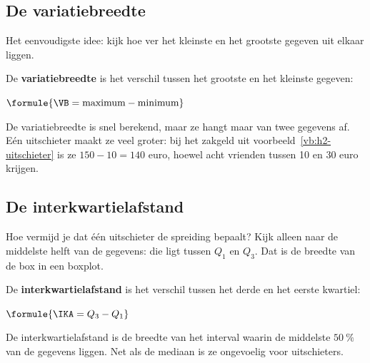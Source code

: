 \subsection{De variatiebreedte}

Het eenvoudigste idee: kijk hoe ver het kleinste en het grootste gegeven uit elkaar liggen.

\begin{theorie}
De \textbf{\textcolor{accent}{variatiebreedte}} is het verschil tussen het grootste en het kleinste gegeven:

\vspace{1mm}
\qquad $\formule{\VB = \text{maximum} - \text{minimum}}$
\end{theorie}


De variatiebreedte is snel berekend, maar ze hangt maar van twee gegevens af. Eén uitschieter maakt ze veel groter: bij het zakgeld uit voorbeeld~\ref{vb:h2-uitschieter} is ze $150 - 10 = 140$ euro, hoewel acht vrienden tussen 10 en 30 euro krijgen.

\subsection{De interkwartielafstand}

Hoe vermijd je dat één uitschieter de spreiding bepaalt? Kijk alleen naar de middelste helft van de gegevens: die ligt tussen $Q_1$ en $Q_3$. Dat is de breedte van de box in een boxplot.

\begin{theorie}
De \textbf{\textcolor{accent}{interkwartielafstand}} is het verschil tussen het derde en het eerste kwartiel:

\vspace{1mm}
\qquad $\formule{\IKA = Q_3 - Q_1}$
\end{theorie}

De interkwartielafstand is de breedte van het interval waarin de middelste $50~\%$ van de gegevens liggen. Net als de mediaan is ze ongevoelig voor uitschieters.


